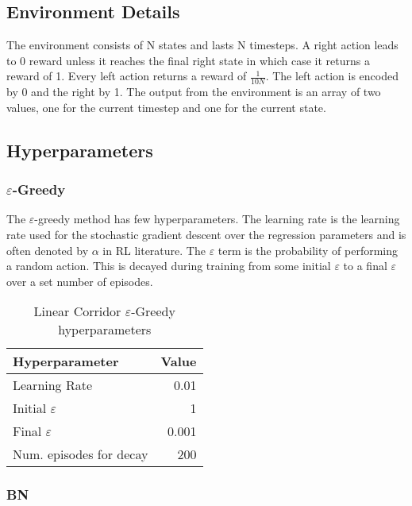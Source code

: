 {{\subsection{Environment Details}

The environment consists of N states and lasts N timesteps. A right action leads to 0 reward unless it reaches the final right state in which case it returns a reward of 1. Every left action returns a reward of $\frac{1}{10N}$. The left action is encoded by 0 and the right by 1. The output from the environment is an array of two values, one for the current timestep and one for the current state.

\subsection{Hyperparameters}

\subsubsection{$\varepsilon$-Greedy}

The $\varepsilon$-greedy method has few hyperparameters. The learning rate is the learning rate used for the stochastic gradient descent over the regression parameters and is often denoted by $\alpha$ in RL literature. The $\varepsilon$ term is the probability of performing a random action. This is decayed during training from some initial $\varepsilon$ to a final $\varepsilon$ over a set number of episodes.

\begin{table}[H]
    \centering
    \begin{tabular}{@{}lr@{}}
        \toprule
        Hyperparameter                     & Value \\ \midrule
        Learning Rate                      & 0.01  \\
        Initial $\varepsilon$              & 1     \\
        Final $\varepsilon$                & 0.001 \\
        Num. episodes for decay            & 200   \\ \bottomrule
    \end{tabular}
    \caption{Linear Corridor $\varepsilon$-Greedy hyperparameters}
\end{table}

\subsubsection{BN}

}}
